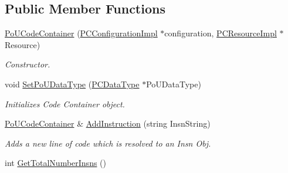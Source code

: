 \subsection*{Public Member Functions}
\begin{DoxyCompactItemize}
\item 
\hyperlink{classpc__emulator_1_1PoUCodeContainer_ad2c9ea317e610e81b96aaee501305c24}{Po\+U\+Code\+Container} (\hyperlink{classpc__emulator_1_1PCConfigurationImpl}{P\+C\+Configuration\+Impl} $\ast$configuration, \hyperlink{classpc__emulator_1_1PCResourceImpl}{P\+C\+Resource\+Impl} $\ast$Resource)\hypertarget{classpc__emulator_1_1PoUCodeContainer_ad2c9ea317e610e81b96aaee501305c24}{}\label{classpc__emulator_1_1PoUCodeContainer_ad2c9ea317e610e81b96aaee501305c24}

\begin{DoxyCompactList}\small\item\em Constructor. \end{DoxyCompactList}\item 
void \hyperlink{classpc__emulator_1_1PoUCodeContainer_a27c04f77508c69dd12308c72be5fd65a}{Set\+Po\+U\+Data\+Type} (\hyperlink{classpc__emulator_1_1PCDataType}{P\+C\+Data\+Type} $\ast$Po\+U\+Data\+Type)\hypertarget{classpc__emulator_1_1PoUCodeContainer_a27c04f77508c69dd12308c72be5fd65a}{}\label{classpc__emulator_1_1PoUCodeContainer_a27c04f77508c69dd12308c72be5fd65a}

\begin{DoxyCompactList}\small\item\em Initializes Code Container object. \end{DoxyCompactList}\item 
\hyperlink{classpc__emulator_1_1PoUCodeContainer}{Po\+U\+Code\+Container} \& \hyperlink{classpc__emulator_1_1PoUCodeContainer_a2f42f66dd588c3e6055311f179bf7b21}{Add\+Instruction} (string Insn\+String)\hypertarget{classpc__emulator_1_1PoUCodeContainer_a2f42f66dd588c3e6055311f179bf7b21}{}\label{classpc__emulator_1_1PoUCodeContainer_a2f42f66dd588c3e6055311f179bf7b21}

\begin{DoxyCompactList}\small\item\em Adds a new line of code which is resolved to an Insn Obj. \end{DoxyCompactList}\item 
int \hyperlink{classpc__emulator_1_1PoUCodeContainer_a125e1efabc8af20f7c21fcff4978cc61}{Get\+Total\+Number\+Insns} ()\hypertarget{classpc__emulator_1_1PoUCodeContainer_a125e1efabc8af20f7c21fcff4978cc61}{}\label{classpc__emulator_1_1PoUCodeContainer_a125e1efabc8af20f7c21fcff4978cc61}


\end{DoxyCompactItemize}
